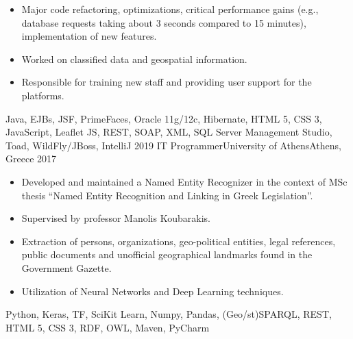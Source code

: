 \begin{experiences}
{\begin{itemize}
                      \item Major code refactoring, optimizations, critical performance gains (e.g., database requests taking about 3 seconds compared to 15 minutes), 
                      implementation of new features.

                      \item Worked on classified data and geospatial information.

                      \item Responsible for training new staff and providing user support for the platforms.
                    \end{itemize}
                    }
                    {Java, EJBs, JSF, PrimeFaces, Oracle 11g/12c, Hibernate, HTML 5, CSS 3, JavaScript, Leaflet JS, REST, SOAP, XML, SQL Server Management Studio, Toad, WildFly/JBoss, IntelliJ}
  \emptySeparator
  \experience
    {2019} {IT Programmer}{University of Athens}{Athens, Greece}
    {2017}    {
                    \begin{itemize}
                      \item Developed and maintained a Named Entity Recognizer in the context of MSc thesis ``Named Entity Recognition and Linking in Greek Legislation''.

                      \item Supervised by professor Manolis Koubarakis.

                      \item Extraction of persons, organizations, geo-political entities, legal references, public documents and unofficial geographical landmarks found in the Government Gazette.

                      \item Utilization of Neural Networks and Deep Learning techniques.
                    \end{itemize}
                    }
                    {Python, Keras, TF, SciKit Learn, Numpy, Pandas, (Geo/st)SPARQL, REST, HTML 5, CSS 3, RDF, OWL, Maven, PyCharm}
\end{experiences}
